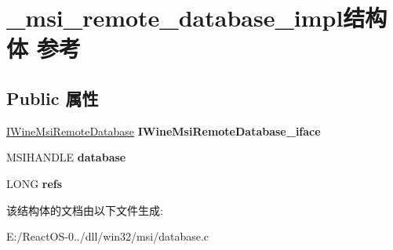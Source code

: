 \hypertarget{struct__msi__remote__database__impl}{}\section{\+\_\+msi\+\_\+remote\+\_\+database\+\_\+impl结构体 参考}
\label{struct__msi__remote__database__impl}
\subsection*{Public 属性}
\begin{DoxyCompactItemize}
\item 
\mbox{\label{struct__msi__remote__database__impl_aad379a696953e8d22d060c8d2156e7d2}} 
\hyperlink{interface_i_wine_msi_remote_database}{I\+Wine\+Msi\+Remote\+Database} {\bfseries I\+Wine\+Msi\+Remote\+Database\+\_\+iface}
\item 
\mbox{\label{struct__msi__remote__database__impl_a497c9ec5b6b4e767897c6276710bdc26}} 
M\+S\+I\+H\+A\+N\+D\+LE {\bfseries database}
\item 
\mbox{\label{struct__msi__remote__database__impl_a74189081dafb1ffee1ebeae6ae352e0f}} 
L\+O\+NG {\bfseries refs}
\end{DoxyCompactItemize}


该结构体的文档由以下文件生成\+:\begin{DoxyCompactItemize}
\item 
E\+:/\+React\+O\+S-\/0../dll/win32/msi/database.\+c\end{DoxyCompactItemize}
